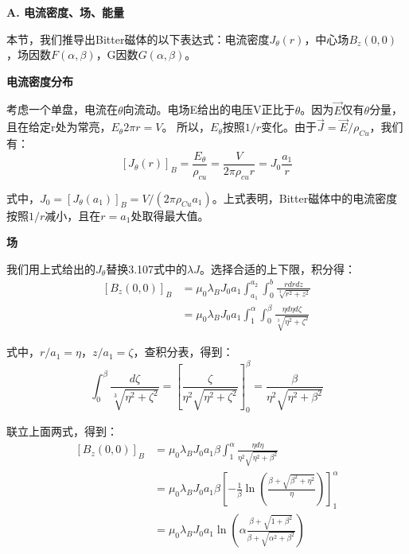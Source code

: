 \textbf{A. 电流密度、场、能量}

本节，我们推导出Bitter磁体的以下表达式：电流密度$J_\theta (r)$，中心场$B_z(0,0)$，场因数$F(\alpha,\beta)$，G因数$G(\alpha,\beta)$。

\textbf{电流密度分布}

考虑一个单盘，电流在$\theta$向流动。电场E给出的电压V正比于$\theta$。因为$\vec{E}$仅有$\theta$分量，且在给定r处为常亮，$E_\theta 2\pi r=V$。
所以，$E_\theta$按照$1/r$变化。由于$\vec{J}=\vec{E}/\rho_{Cu}$，我们有：
\begin{equation}
{[J_\theta(r)]}_B=\frac{E_{\theta}}{\rho_{cu}}=\frac{V}{2\pi\rho_{cu}r}=J_0\frac{a_1}{r}%
\end{equation}

式中，$J_0=[J_\theta(a_1)]_B=V/(2\pi \rho_{Cu} a_1)$。上式表明，Bitter磁体中的电流密度按照$1/r$减小，且在$r=a_1$处取得最大值。

\textbf{场}

我们用上式给出的$J_\theta$替换3.107式中的$\lambda J$。选择合适的上下限，积分得：
\begin{equation*}
\begin{split}
{[B_z(0,0)]}_B&=\mu_0\lambda_B J_0a_1\int_{a_1}^{a_2}\int_{0}^{b}\frac{r dr dz}{\sqrt[3]{r^2+z^2}}\\
&=\mu_0\lambda_B J_0 a_1\int_{1}^{\alpha}\int_{0}^{\beta}\frac{\eta d\eta d\zeta}{\sqrt[3]{\eta^2+\zeta^2}}%
\end{split}
\end{equation*}

式中，$r/a_1=\eta$，$z/a_1=\zeta$，查积分表，得到：
\begin{equation*}
\int_{0}^{\beta}\frac{d\zeta}{\sqrt[3]{\eta^2+\zeta^2}}=\left[\frac{\zeta}{\eta^2\sqrt{\eta^2+\zeta^2}}\right]_0^{\beta}=\frac{\beta}{\eta^2\sqrt{\eta^2+\beta^2}}%
\end{equation*}

联立上面两式，得到：
\begin{equation*}
\begin{split}
{[B_z(0,0)]}_B&=\mu_0\lambda_B J_0a_1\beta\int_{1}^{\alpha}\frac{\eta d\eta}{\eta^2\sqrt{\eta^2+\beta^2}}\\
&=\mu_0\lambda_B J_0a_1\beta\left[-\frac{1}{\beta}\ln(\frac{\beta+\sqrt{\beta^2+\eta^2}}{\eta})\right]_1^{\alpha}\\ %
&=\mu_0\lambda_B J_0a_1\ln\left(\alpha\frac{\beta+\sqrt{1+\beta^2}}{\beta+\sqrt{\alpha^2+\beta^2}}\right)%
\end{split}
\end{equation*}


